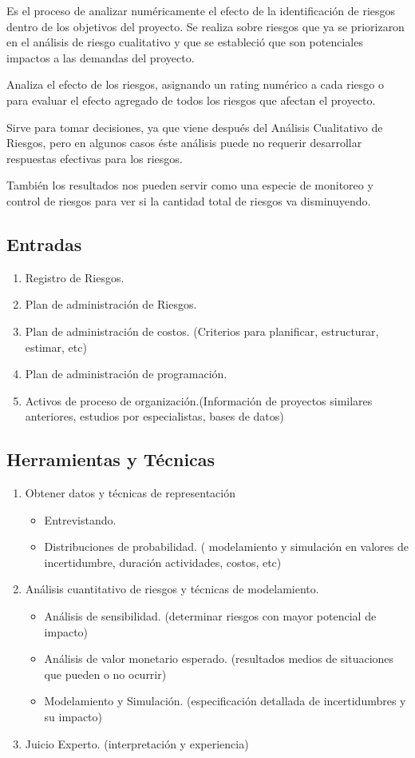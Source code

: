 Es el proceso de analizar numéricamente el efecto de la
identificación de riesgos dentro de los objetivos del proyecto.
Se realiza sobre riesgos que ya se priorizaron en el análisis
de riesgo cualitativo y que se estableció que son potenciales
impactos a las demandas del proyecto.

Analiza el efecto de los riesgos, asignando un rating numérico
a cada riesgo o para evaluar el efecto agregado de todos los
riesgos que afectan el proyecto.

Sirve para tomar decisiones, ya que viene después del
Análisis Cualitativo de Riesgos, pero en algunos casos éste análisis
puede no requerir desarrollar respuestas efectivas para los riesgos.

También los resultados nos pueden servir como una especie de monitoreo
y control de riesgos para ver si la cantidad total de riesgos va disminuyendo.

\subsection{Entradas}
\begin{enumerate}
	\item Registro de Riesgos.
	\item Plan de administración de Riesgos.
	\item Plan de administración de costos. (Criterios para planificar, estructurar, estimar, etc)
	\item Plan de administración de programación.
	\item Activos de proceso de organización.(Información de proyectos similares
        anteriores, estudios por especialistas, bases de datos) 
\end{enumerate}

\subsection{Herramientas y Técnicas}
\begin{enumerate}
	\item Obtener datos y técnicas de representación
		\begin{itemize}
			\item Entrevistando.
			\item Distribuciones de probabilidad. ( modelamiento y simulación en valores de incertidumbre, duración actividades, costos, etc)
		\end{itemize}
	\item Análisis cuantitativo de riesgos y técnicas de modelamiento.
		\begin{itemize}
		\item Análisis de sensibilidad. (determinar riesgos con mayor potencial de impacto)
		\item Análisis de valor monetario esperado. (resultados medios de situaciones que pueden o no ocurrir) 
		\item Modelamiento y Simulación. (especificación detallada de incertidumbres y su impacto)
		\end{itemize}
	\item Juicio Experto. (interpretación y experiencia)
\end{enumerate}

